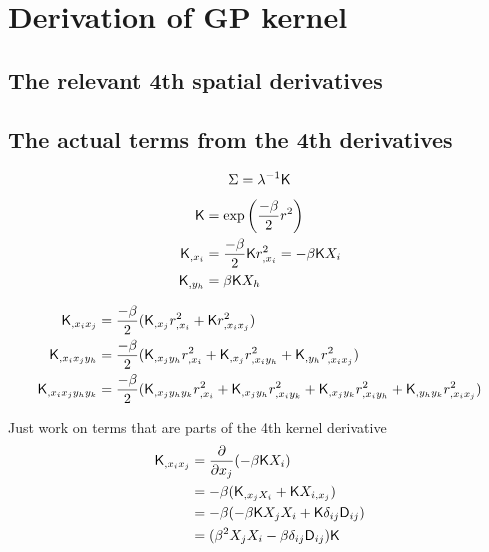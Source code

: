 \appendix 

\section{Derivation of GP kernel}


\subsection{The relevant 4th spatial derivatives}




\subsection{The actual terms from the 4th derivatives}
\begin{equation*}
\Sigma = \lambda^{-1} \mathsf{K} 
\end{equation*}

\begin{align}
\mathsf{K} &= \exp{\left(\frac{-\beta}{2} r^2 \right)}\\
\mathsf{K}_{,x_i} &= \frac{-\beta}{2} \mathsf{K} r^2_{,x_i} = -\beta \mathsf{K} X_i\\ 
\mathsf{K}_{,y_h} &= \beta \mathsf{K} X_h 
\end{align}

\begin{align}
\mathsf{K}_{,x_i x_j} &= \frac{-\beta}{2}(\mathsf{K}_{,x_j} r^2_{,x_i} + \mathsf{K} r^2_{,x_i x_j})\\
\mathsf{K}_{,x_i x_j y_h} &= \frac{-\beta}{2}(\mathsf{K}_{,x_j y_h} r^2_{,x_i} + \mathsf{K}_{,x_j}
r^2_{,x_i y_h} + \mathsf{K}_{,y_h} r^2_{,x_i x_j})\\
\mathsf{K}_{,x_i x_j y_h y_k} &= \frac{-\beta}{2} 
(\mathsf{K}_{,x_j y_h y_k} r^2_{,x_i} +
\mathsf{K}_{,x_j y_h} r^2_{,x_i y_k} + 
\mathsf{K}_{,x_j y_k} r^2_{,x_i y_h} + 
\mathsf{K}_{,y_h y_k} r^2_{,x_i x_j} )
\label{eq:4th_derivative_intermediate_expression}
\end{align}

Just work on terms that are parts of the 4th kernel derivative 
\begin{align*}
\mathsf{K}_{,x_i x_j} &= \frac{\partial}{\partial x_j} (-\beta \mathsf{K} X_i)\\
&= -\beta(\mathsf{K}_{,x_j X_i} + \mathsf{K} X_{i, x_j})\\ 
&= -\beta(-\beta \mathsf{K} X_j X_i + \mathsf{K} \delta_{ij} \mathsf{D}_{ij}) \\ 
&= (\beta^2 X_j X_i - \beta \delta_{ij} \mathsf{D}_{ij})\mathsf{K} 
\end{align*}

